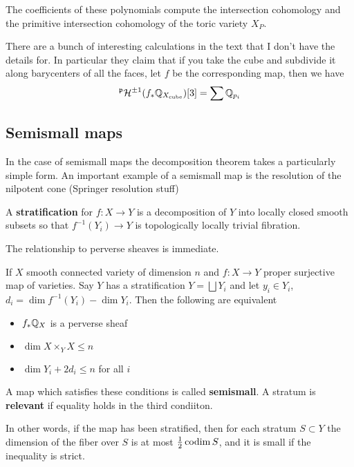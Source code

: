 \documentclass[12pt]{article}
\begin{document}
\begin{proposition}
    The coefficients of these polynomials compute
    the intersection cohomology and the primitive
    intersection cohomology of the toric variety $X_P$.
\end{proposition}

\begin{remark}
    There are a bunch of interesting calculations in the text that
    I don't have the details for. In particular they claim that if you take
    the cube and subdivide it along barycenters of all the faces, let $f$
    be the corresponding map, then we have \begin{align*}
        ^{\mathfrak{p}}{\mathcal{H}}^{\pm 1}(f_*\mathbb{Q}_{X_\text{cube}})[3] = \sum \mathbb{Q}_{p_i}
    \end{align*}
\end{remark}

\subsection{Semismall maps}
In the case of semismall maps the decomposition theorem takes a
particularly simple form. An important example of a semismall map is the resolution of the
nilpotent cone (Springer resolution stuff)

\begin{definition}
    A \textbf{stratification} for $f:X\to Y$ is a
    decomposition of $Y$ into locally closed smooth subsets
    so that $f^{-1}(Y_i) \to Y$ is topologically locally trivial fibration.
\end{definition}

The relationship to perverse sheaves is immediate.
\begin{proposition}
    If $X$ smooth connected variety of dimension $n$ and $f:X\to Y$ proper surjective map of varieties. Say $Y$ has a stratification $Y = \bigsqcup Y_i$ and let $y_i\in Y_i$, $d_i =
        \dim f^{-1}(Y_i) - \dim Y_i$. Then the following are equivalent
    \begin{itemize}
        \item $f_*\mathbb{Q}_X$ is a perverse sheaf
        \item $\dim X \times_Y X \leq n$
        \item $\dim Y_i + 2d_i \leq n$ for all $i$
    \end{itemize}
    A map which satisfies these conditions is called \textbf{semismall}.
    A stratum is \textbf{relevant} if equality holds in the third condiiton.
\end{proposition}
In other words, if the map has been stratified, then for each stratum $S\subset Y$ the dimension of
the fiber over $S$ is at most $\frac{1}{2} \operatorname{codim} S$, and it is small
if the inequality is strict.
\end{document}
